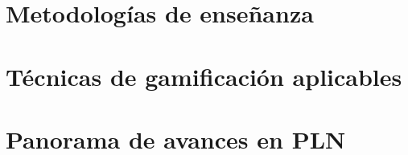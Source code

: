 \section{Metodologías de enseñanza}




\section{Técnicas de gamificación aplicables}




\newpage
\section{Panorama de avances en PLN}


